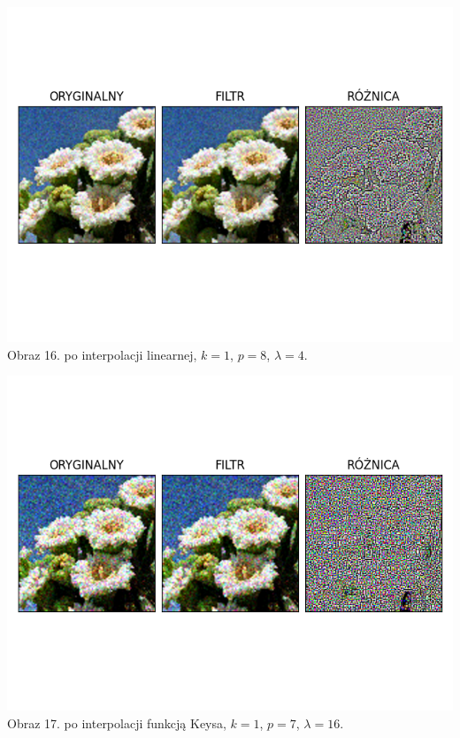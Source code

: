 \documentclass[14pt]{article}
\begin{document}
\begin{center}
    \includegraphics[scale=0.7]{images/keys_poisson4x_k1_p8.png}
    \\ \small Obraz 16. po interpolacji linearnej,
    $k=1$, $p=8$, $\lambda=4$.

    \includegraphics[scale=0.7]{images/keys_poisson16x_k1_p7.png}
    \\ \small Obraz 17. po interpolacji funkcją Keysa,
    $k=1$, $p=7$, $\lambda=16$.


\end{center}
\end{document}

